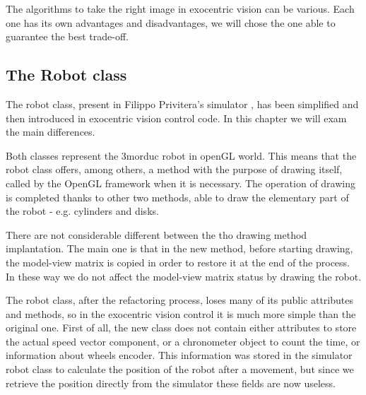 %
The algorithms to take the right image in exocentric vision can be various. Each one has its own
advantages and disadvantages, we will chose the one able to guarantee the best trade-off.


\subsection{The Robot class}
The robot class, present in Filippo Privitera's simulator 
\cite{privitera}, has been simplified and then introduced in
exocentric vision control code. In this chapter we will 
exam the main differences.
%

%
Both classes represent the 3morduc robot in openGL world. 
This means that the robot class offers, among others, a
method with the purpose of drawing itself, called by the 
OpenGL framework when it is necessary. The operation of 
drawing is completed thanks to other two methods, able 
to draw the elementary part of the robot - e.g. cylinders and disks.
%

%
There are not considerable different between the tho 
drawing method implantation. The main one is that in the 
new method, before starting drawing, the model-view matrix 
is copied in order to restore it at the end of the process. 
In these way we do not affect the model-view matrix status 
by drawing the robot.
%

%
The robot class, after the refactoring process, loses many 
of its public attributes and methods, so in the
exocentric vision control it is much more simple than the 
original one. First of all, the new class does not contain either
attributes to store the actual speed vector component, or 
a chronometer object to count the time, or information about wheels
encoder. This information was stored in the simulator robot 
class to calculate the position of the robot after a movement,
but since we retrieve the position directly from the simulator 
these fields are now useless. 
%

